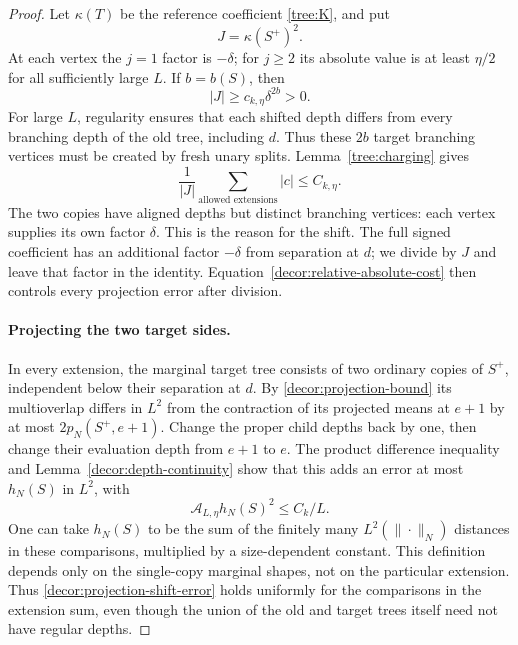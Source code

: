 \begin{proof}
Let $\kappa(T)$ be the reference coefficient \eqref{tree:K}, and put
\begin{equation}
 J=\kappa(S^+)^2.
 \label{decor:J-definition}
\end{equation}
At each
vertex the $j=1$ factor is $-\delta$; for $j\ge2$ its absolute value
is at least $\eta/2$ for all sufficiently large $L$.  If $b=b(S)$,
then
\begin{equation}
 |J|\ge c_{k,\eta}\delta^{2b}>0.
 \label{decor:J-lower-bound}
\end{equation}
For large $L$, regularity ensures that each shifted depth differs from
every branching depth of the old tree, including $d$. Thus these $2b$
target branching vertices must be created by fresh unary splits.
Lemma~\ref{tree:charging} gives
\begin{equation}
 \frac1{|J|}\sum_{\text{allowed extensions}}|c|
        \le C_{k,\eta}.
 \label{decor:relative-absolute-cost}
\end{equation}
The two copies have aligned depths but distinct branching vertices:
each vertex supplies its own factor $\delta$. This is the reason for
the shift. The full signed coefficient has an additional factor
$-\delta$ from separation at $d$; we divide by $J$ and leave that
factor in the identity. Equation~\eqref{decor:relative-absolute-cost}
then controls every projection error after division.

\paragraph{Projecting the two target sides.}
In every extension, the marginal target tree consists of two
ordinary copies of $S^+$, independent below their separation at $d$.
By \eqref{decor:projection-bound} its multioverlap differs in
$L^2$ from the contraction of its projected means at $e+1$ by at
most $2p_N(S^+,e+1)$.  Change the proper child depths back by one,
then change their evaluation depth from $e+1$ to $e$.  The product
difference inequality and Lemma~\ref{decor:depth-continuity} show
that this adds an error at most $h_N(S)$ in $L^2$, with
\begin{equation}
 \mathcal A_{L,\eta}h_N(S)^2\le C_k/L.
 \label{decor:projection-shift-error}
\end{equation}
One can take $h_N(S)$ to be the sum of the finitely many
$L^2(\|\cdot\|_N)$ distances in these comparisons, multiplied by
a size-dependent constant.  This definition depends only on the
single-copy marginal shapes, not on the particular extension.
Thus \eqref{decor:projection-shift-error} holds uniformly for the
comparisons in the extension sum, even though the union of the
old and target trees itself need not have regular depths.


\end{proof}
